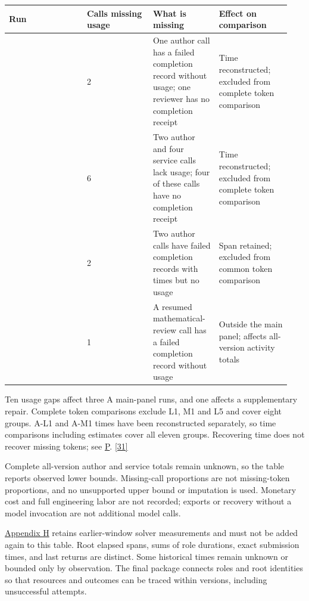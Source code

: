 \begingroup\small\setlength{\tabcolsep}{3pt}\renewcommand{\arraystretch}{1.14}
\par\nopagebreak\medskip\noindent\begin{minipage}[t]{\linewidth}
\begin{tabular}{>{\raggedright\arraybackslash}p{0.26\linewidth}>{\raggedright\arraybackslash}p{0.22\linewidth}>{\raggedright\arraybackslash}p{0.22\linewidth}>{\raggedright\arraybackslash}p{0.24\linewidth}}
\toprule
\textbf{Run} & \textbf{Calls missing usage} & \textbf{What is missing} & \textbf{Effect on comparison}\\\midrule

{A-L1} & {2} & {One author call has a failed completion record without usage; one reviewer has no completion receipt} & {Time reconstructed; excluded from complete token comparison}\\
{A-M1} & {6} & {Two author and four service calls lack usage; four of these calls have no completion receipt} & {Time reconstructed; excluded from complete token comparison}\\
{A-L5} & {2} & {Two author calls have failed completion records with times but no usage} & {Span retained; excluded from common token comparison}\\
{A-L7 separate repair} & {1} & {A resumed mathematical-review call has a failed completion record without usage} & {Outside the main panel; affects all-version activity totals}\\
\bottomrule\end{tabular}\end{minipage}\par\medskip\endgroup
Ten usage gaps affect three A main-panel runs, and one affects a supplementary repair. Complete token comparisons exclude L1, M1 and L5 and cover eight groups. A-L1 and A-M1 times have been reconstructed separately, so time comparisons including estimates cover all eleven groups. Recovering time does not recover missing tokens; see \hyperlink{appendix-p}{P}. \href{en.pdf\#ref-31}{\mbox{[31]}}

Complete all-version author and service totals remain unknown, so the table reports observed lower bounds. Missing-call proportions are not missing-token proportions, and no unsupported upper bound or imputation is used. Monetary cost and full engineering labor are not recorded; exports or recovery without a model invocation are not additional model calls.

\hyperlink{appendix-h}{Appendix H} retains earlier-window solver measurements and must not be added again to this table. Root elapsed spans, sums of role durations, exact submission times, and last returns are distinct. Some historical times remain unknown or bounded only by observation. The final package connects roles and root identities so that resources and outcomes can be traced within versions, including unsuccessful attempts.

